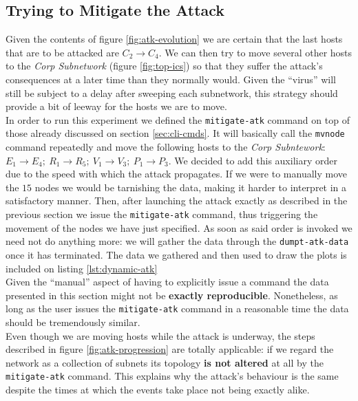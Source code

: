         \subsection{Trying to Mitigate the Attack}
            Given the contents of figure \ref{fig:atk-evolution} we are certain that the last hosts that are to be attacked are $C_2 \to C_4$. We can then try to move several other hosts to the \textit{Corp Subnetwork} (figure \ref{fig:top-ics}) so that they suffer the attack's consequences at a later time than they normally would. Given the ``virus'' will still be subject to a delay after sweeping each subnetwork, this strategy should provide a bit of leeway for the hosts we are to move.\\

            In order to run this experiment we defined the \texttt{mitigate-atk} command on top of those already discussed on section \ref{sec:cli-cmds}. It will basically call the \texttt{mvnode} command repeatedly and move the following hosts to the \textit{Corp Subntework}: $E_1 \to E_4;\ R_1 \to R_5;\ V_1 \to V_3;\ P_1 \to P_3$. We decided to add this auxiliary order due to the speed with which the attack propagates. If we were to manually move the $15$ nodes we would be tarnishing the data, making it harder to interpret in a satisfactory manner. Then, after launching the attack exactly as described in the previous section we issue the \texttt{mitigate-atk} command, thus triggering the movement of the nodes we have just specified. As soon as said order is invoked we need not do anything more: we will gather the data through the \texttt{dumpt-atk-data} once it has terminated. The data we gathered and then used to draw the plots is included on listing \ref{lst:dynamic-atk}\\

            Given the ``manual'' aspect of having to explicitly issue a command the data presented in this section might not be \textbf{exactly reproducible}. Nonetheless, as long as the user issues the \texttt{mitigate-atk} command in a reasonable time the data should be tremendously similar.\\

            Even though we are moving hosts while the attack is underway, the steps described in figure \ref{fig:atk-progression} are totally applicable: if we regard the network as a collection of subnets its topology \textbf{is not altered} at all by the \texttt{mitigate-atk} command. This explains why the attack's behaviour is the same despite the times at which the events take place not being exactly alike.\\

